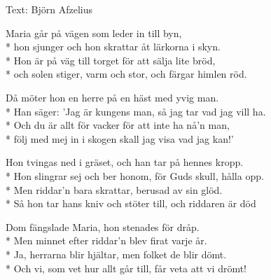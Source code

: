 \begin{SongText}
    \begin{SongInfo}
        Text: Björn Afzelius
    \end{SongInfo}
    \begin{SongVerse}
        Maria går på vägen som leder in till byn,\\*%
        hon sjunger och hon skrattar åt lärkorna i skyn.\\*%
        Hon är på väg till torget för att sälja lite bröd,\\*%
        och solen stiger, varm och stor, och färgar himlen röd.
    \end{SongVerse}
    \begin{SongVerse}
        Då möter hon en herre på en häst med yvig man.\\*%
        Han säger: 'Jag är kungens man, så jag tar vad jag vill ha.\\*%
        Och du är allt för vacker för att inte ha nå'n man,\\*%
        följ med mej in i skogen skall jag visa vad jag kan!'
    \end{SongVerse}
    \begin{SongVerse}
        Hon tvingas ned i gräset, och han tar på hennes kropp.\\*%
        Hon slingrar sej och ber honom, för Guds skull, hålla opp.\\*%
        Men riddar'n bara skrattar, berusad av sin glöd.\\*%
        Så hon tar hans kniv och stöter till, och riddaren är död
    \end{SongVerse}
    \begin{SongVerse}
        Dom fängslade Maria, hon stenades för dråp.\\*%
        Men minnet efter riddar'n blev firat varje år.\\*%
        Ja, herrarna blir hjältar, men folket de blir dömt.\\*%
        Och vi, som vet hur allt går till, får veta att vi drömt!
    \end{SongVerse}
\end{SongText}